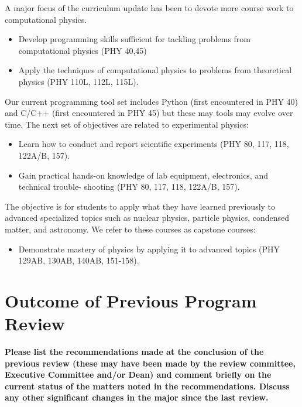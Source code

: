 \documentclass[12pt]{article}
\begin{document}
A major focus of the curriculum update has been to devote more course
work to computational physics.
\begin{itemize} 
 \item Develop programming skills sufficient for tackling problems
   from computational physics (PHY 40,45)
 \item Apply the techniques of computational physics to problems from
   theoretical physics (PHY 110L, 112L, 115L).
\end{itemize}
Our current programming tool set includes Python (first encountered in
PHY 40) and C/C++ (first encountered in PHY 45) but these may tools
may evolve over time.  The next set of objectives are related to
experimental physics:
\begin{itemize}
 \item Learn how to conduct and report scientific experiments (PHY 80,
   117, 118, 122A/B, 157).
 \item Gain practical hands-on knowledge of lab equipment,
   electronics, and technical trouble- shooting (PHY 80, 117, 118,
   122A/B, 157).
\end{itemize}
The objective is for students to apply what they have learned
previously to advanced specialized topics such as nuclear physics,
particle physics, condensed matter, and astronomy.  We refer to these
courses as capstone courses:
\begin{itemize}
 \item Demonstrate mastery of physics by applying it to advanced
   topics (PHY 129AB, 130AB, 140AB, 151-158).
\end{itemize}

\newpage
\section{Outcome of Previous Program Review}
\label{sec:previous}

{\bf Please list the recommendations made at the conclusion of the
  previous review (these may have been made by the review committee,
  Executive Committee and/or Dean) and comment briefly on the current
  status of the matters noted in the recommendations. Discuss any
  other significant changes in the major since the last review.}\\
\end{document}
